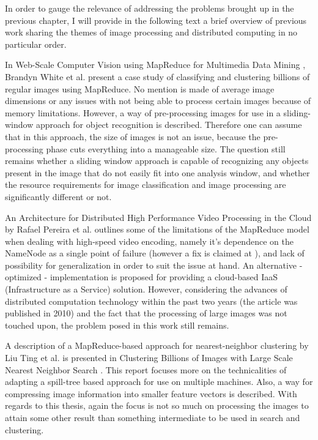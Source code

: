 \documentclass [12pt,a4paper]{report}
\begin{document}
In order to gauge the relevance of addressing the problems brought up in the previous chapter, I will provide in the following text a brief overview of previous work sharing the themes of image processing and distributed computing in no particular order. 

In Web-Scale Computer Vision using MapReduce for Multimedia Data Mining \cite{White:2010:WCV:1814245.1814254}, Brandyn White et al. present a case study of classifying and clustering billions of regular images using MapReduce. No mention is made of average image dimensions or any issues with not being able to process certain images because of memory limitations. However, a way of pre-processing images for use in a sliding-window approach for object recognition is described. Therefore one can assume that in this approach, the size of images is not an issue, because the pre-processing phase cuts everything into a manageable size. The question still remains whether a sliding window approach is capable of recognizing any objects present in the image that do not easily fit into one analysis window, and whether the resource requirements for image classification and image processing are significantly different or not.

An Architecture for Distributed High Performance Video Processing in the Cloud \cite{Pereira:2010:ADH:1844768.1845374} by Rafael Pereira et al. outlines some of the limitations of the MapReduce model when dealing with high-speed video encoding, namely it's dependence on the NameNode as a single point of failure (however a fix is claimed at \cite{website:facebook_namenode_improvements}), and lack of possibility for generalization in order to suit the issue at hand. An alternative - optimized - implementation is proposed for providing a cloud-based IaaS (Infrastructure as a Service) solution. However, considering the advances of distributed computation technology within the past two years (the article was published in 2010) and the fact that the processing of large images was not touched upon, the problem posed in this work still remains.

A description of a MapReduce-based approach for nearest-neighbor clustering by Liu Ting et al. is presented in Clustering Billions of Images with Large Scale Nearest Neighbor Search \cite{citeulike:2631015}. This report focuses more on the technicalities of adapting a spill-tree based approach for use on multiple machines. Also, a way for compressing image information into smaller feature vectors is described. With regards to this thesis, again the focus is not so much on processing the images to attain some other result than something intermediate to be used in search and clustering.
\end{document}
